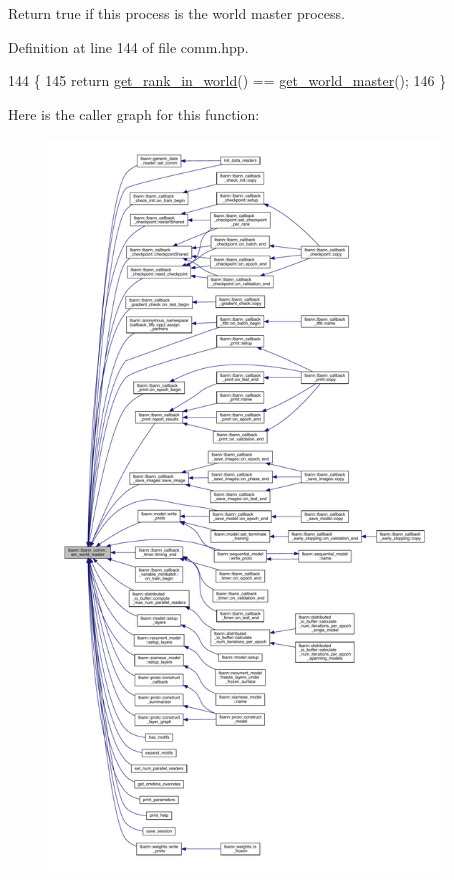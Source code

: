 Return true if this process is the world master process. 

Definition at line 144 of file comm.\+hpp.


\begin{DoxyCode}
144                                       \{
145     \textcolor{keywordflow}{return} \hyperlink{classlbann_1_1lbann__comm_a4519335d6772dab3c36517618260d48a}{get\_rank\_in\_world}() == \hyperlink{classlbann_1_1lbann__comm_aa682313f366e0b7cf781bc1872911f65}{get\_world\_master}();
146   \}
\end{DoxyCode}
Here is the caller graph for this function\+:\nopagebreak
\begin{figure}[H]
\begin{center}
\leavevmode
\includegraphics[height=550pt]{classlbann_1_1lbann__comm_a1ef526486183a29feadca9bef096a534_icgraph}
\end{center}
\end{figure}
\mbox{\label{classlbann_1_1lbann__comm_a303c02c5a127f3ed21f12c9a71cc90a6}} 
